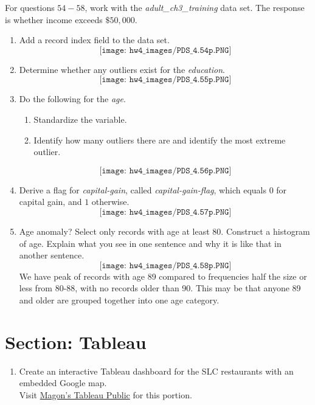 \documentclass[11pt]{article}
\theoremstyle{definition}
\newcommand{\1}[1]{\mathbf{1} \left \{ #1 \right \}}
\begin{document}
For questions $54-58$, work with the \textit{adult\_ch3\_training} data set. The response is whether income exceeds $\$50,000$.
\begin{enumerate}\addtocounter{enumi}{53}
    \item Add a record index field to the data set.
    \[\texttt{[image: hw4\_images/PDS\_4.54p.PNG]}\]
    \item Determine whether any outliers exist for the \textit{education}.
    \[\texttt{[image: hw4\_images/PDS\_4.55p.PNG]}\]
    \item Do the following for the \textit{age}.
    \begin{enumerate}[(1)]
        \item Standardize the variable.
        \item Identify how many outliers there are and identify the most extreme outlier.
    \end{enumerate}
    \[\texttt{[image: hw4\_images/PDS\_4.56p.PNG]}\]
    \item Derive a flag for \textit{capital-gain}, called \textit{capital-gain-flag}, which equals $0$ for capital gain, and $1$ otherwise.
    \[\texttt{[image: hw4\_images/PDS\_4.57p.PNG]}\]
    \item Age anomaly? Select only records with age at least $80$.  Construct a histogram of age.  Explain what you see in one sentence and why it is like that in another sentence.
    \[\texttt{[image: hw4\_images/PDS\_4.58p.PNG]}\]
    We have peak of records with age 89 compared to frequencies half the size or less from 80-88, with no records older than 90.  This may be that anyone 89 and older are grouped together into one age category.
\end{enumerate}


\section{Section: Tableau}
\begin{enumerate}\addtocounter{enumi}{58}
    \item Create an interactive Tableau dashboard for the SLC restaurants with an embedded Google map. \\
    Visit \href{https://public.tableau.com/profile/magon7952#!/vizhome/Bowling\_PDS\_Assignment4_Restaurants/Restaurants?publish=yes}{Magon's Tableau Public} for this portion.
\end{enumerate}
\end{document}
